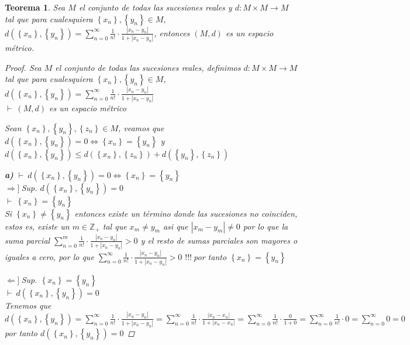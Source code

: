 \documentclass[oneside]{book} %
\theoremstyle{Teorema}
\newtheorem{Teorema}[Definicion]{Teorema}
\theoremstyle{Ejemplos}
\theoremstyle{[Obs]}
\newcommand{\abs}[1]{\left|#1\right|} %
\renewcommand{\{}{\left\lbrace} %
\renewcommand{\}}{\right\rbrace} %
\newcommand{\Z}{\mathbb{Z}} %
\newcommand{\pd}{$\vdash\ $} %
\renewcommand{\c}{$!!!\ $} %
\newcommand{\necesidad}{$\Rightarrow]\ $} %
\newcommand{\suficiencia}{$\Leftarrow]\ $} %
\begin{document}
			\begin{Teorema}\setlength{\parindent}{0em}
				
				Sea $M$ el conjunto de todas las sucesiones reales y $d : M \times M \to M$ tal que para cualesquiera $\{ x_n \}, \{ y_n \} \in M$, $d(\{ x_n \}, \{ y_n \}) = \sum_{n = 0}^{\infty} \frac{1}{n!} \cdot \frac{\abs{x_n - y_n}}{1 + \abs{x_n - y_n}}$, entonces $(M, d)$ es un espacio métrico. 

				\begin{proof}
					
					Sea $M$ el conjunto de todas las sucesiones reales, definimos $d : M \times M \to M$ tal que para cualesquiera $\{ x_n \}, \{ y_n \} \in M$, $d(\{ x_n \}, \{ y_n \}) = \sum_{n = 0}^{\infty} \frac{1}{n!} \cdot \frac{\abs{x_n - y_n}}{1 + \abs{x_n - y_n}}$ \\
					\pd $(M, d)$ es un espacio métrico

					Sean $\{ x_n \}, \{ y_n \}, \{ z_n \} \in M$, veamos que $d(\{ x_n \}, \{ y_n \}) = 0 \Leftrightarrow \{ x_n \} = \{ y_n \}$ y $d(\{ x_n \}, \{ y_n \}) \leq d(\{ x_n \}, \{ z_n \}) + d(\{ y_n \}, \{ z_n \})$

					\textbf{a)} \pd $d(\{ x_n \}, \{ y_n \}) = 0 \Leftrightarrow \{ x_n \} = \{ y_n \}$ \\
					\necesidad Sup. $d(\{ x_n \}, \{ y_n \}) = 0$ \\
					\pd $\{ x_n \} = \{ y_n \}$ \\
					Si $\{ x_n \} \neq \{ y_n \}$ entonces existe un término donde las sucesiones no coinciden, estos es, existe un $m \in \Z_{+}$ tal que $x_m \neq y_m$ asi que $\abs{x_m - y_m} \neq 0$ por lo que la suma parcial $\sum_{n = 0}^{m} \frac{1}{n!} \cdot \frac{\abs{x_n - y_n}}{1 + \abs{x_n - y_n}} > 0$ y el resto de sumas parciales son mayores o iguales a cero, por lo que $\sum_{n = 0}^{\infty} \frac{1}{n!} \cdot \frac{\abs{x_n - y_n}}{1 + \abs{x_n - y_n}} > 0$ \c por tanto $\{ x_n \} = \{ y_n \}$

					\suficiencia Sup. $\{ x_n \} = \{ y_n \}$ \\
					\pd $d(\{ x_n \}, \{ y_n \}) = 0$ \\
					Tenemos que $d(\{ x_n \}, \{ y_n \}) = \sum_{n = 0}^{\infty} \frac{1}{n!} \cdot \frac{\abs{x_n - y_n}}{1 + \abs{x_n - y_n}} = \sum_{n = 0}^{\infty} \frac{1}{n!} \cdot \frac{\abs{x_n - x_n}}{1 + \abs{x_n - x_n}} = \sum_{n = 0}^{\infty} \frac{1}{n!} \cdot \frac{0}{1 + 0} = \sum_{n = 0}^{\infty} \frac{1}{n!} \cdot 0 = \sum_{n = 0}^{\infty} 0 = 0$ por tanto $d(\{ x_n \}, \{ y_n \}) = 0$


\end{proof}
\end{Teorema}
\end{document}
